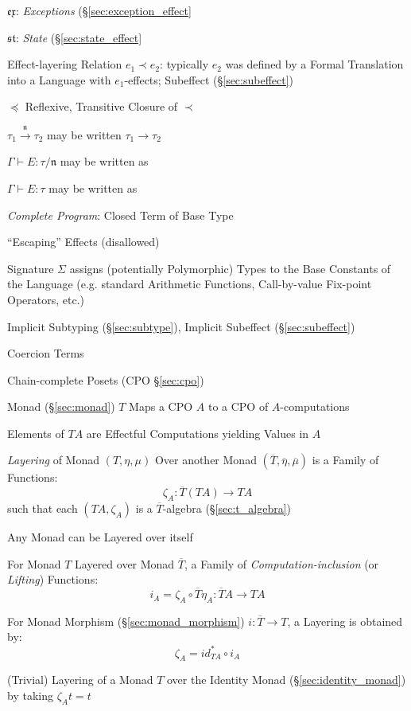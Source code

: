 $\mathfrak{ex}$: \emph{Exceptions} (\S\ref{sec:exception_effect}

$\mathfrak{st}$: \emph{State} (\S\ref{sec:state_effect}

Effect-layering Relation $e_1 \prec e_2$: typically $e_2$ was defined
by a Formal Translation into a Language with $e_1$-effects; Subeffect
(\S\ref{sec:subeffect})

$\preceq$ Reflexive, Transitive Closure of $\prec$

$\tau_1 \xrightarrow{\mathfrak{n}} \tau_2$ may be written $\tau_1
\rightarrow \tau_2$

$\Gamma \vdash E : \tau / \mathfrak{n}$ may be written as

$\Gamma \vdash E : \tau$ may be written as

\emph{Complete Program}: Closed Term of Base Type

``Escaping'' Effects (disallowed)

Signature $\Sigma$ assigns (potentially Polymorphic) Types to the Base
Constants of the Language (e.g. standard Arithmetic Functions,
Call-by-value Fix-point Operators, etc.)

Implicit Subtyping (\S\ref{sec:subtype}), Implicit Subeffect
(\S\ref{sec:subeffect})

Coercion Terms

Chain-complete Posets (CPO \S\ref{sec:cpo})

Monad (\S\ref{sec:monad}) $T$ Maps a CPO $A$ to a CPO of
$A$-computations

Elements of $T A$ are Effectful Computations yielding Values in $A$

\emph{Layering} of Monad $(T,\eta,\mu)$ Over another Monad
$(\overline{T}, \overline{\eta}, \overline{\mu})$ is a Family of
Functions:
\[
  \zeta_A : \overline{T}(T A) \rightarrow T A
\]
such that each $(T A, \zeta_A)$ is a $\overline{T}$-algebra
(\S\ref{sec:t_algebra}) %

Any Monad can be Layered over itself %

For Monad $T$ Layered over Monad $\overline{T}$, a Family of
\emph{Computation-inclusion} (or \emph{Lifting}) Functions:
\[
  i_A = \zeta_A \circ \overline{T} \eta_A :
    \overline{T} A \rightarrow T A
\]

For Monad Morphism (\S\ref{sec:monad_morphism}) $i : \overline{T}
\rightarrow T$, a Layering is obtained by:
\[
  \zeta_A = id^*_{T A} \circ i_A
\]

(Trivial) Layering of a Monad $T$ over the Identity Monad
(\S\ref{sec:identity_monad}) by taking $\zeta_A t = t$

